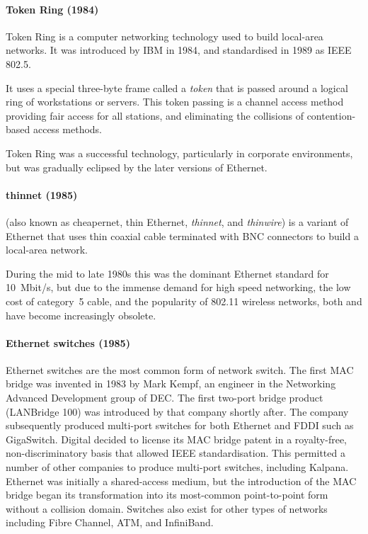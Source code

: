 \paragraph{Token Ring (1984)}%
Token Ring is a computer networking technology used to build local-area networks.
It was introduced by IBM in 1984, and standardised in 1989 as \acs{IEEE} 802.5.

It uses a special three-byte frame called a \emph{token} that is passed around a logical ring of workstations or servers.
This token passing is a channel access method providing fair access for all stations, and eliminating the collisions of contention-based access methods.

Token Ring was a successful technology, particularly in corporate environments, but was gradually eclipsed by the later versions of Ethernet.

\paragraph{thinnet (1985)}%
 (also known as cheapernet, thin Ethernet, \emph{thinnet}, and \emph{thinwire}) is a variant of Ethernet that uses thin coaxial cable terminated with \acs{BNC} connectors to build a local-area network.

During the mid to late 1980s this was the dominant Ethernet standard for 10~Mbit/s, %
but due to the immense demand for high speed networking, the low cost of category~5 cable, and the popularity of 802.11 wireless networks, both  and  have become increasingly obsolete.

\paragraph{Ethernet switches (1985)}%
Ethernet switches are the most common form of network switch.
The first \acs{MAC} bridge was invented in 1983 by Mark Kempf, an engineer in the Networking Advanced Development group of \gls{DEC}.
The first two-port bridge product (LANBridge 100) was introduced by that company shortly after.
The company subsequently produced multi-port switches for both Ethernet and \acs{FDDI} such as GigaSwitch.
Digital decided to license its \acs{MAC} bridge patent in a royalty-free, non-dis\-crim\-i\-na\-tory basis that allowed \acs{IEEE} standardisation.
This permitted a number of other companies to produce multi-port switches, including Kalpana.
Ethernet was initially a shared-access medium, but the introduction of the \acs{MAC} bridge began its transformation into its most-common point-to-point form without a collision domain.
Switches also exist for other types of networks including Fibre Channel, \gls{ATM}, and InfiniBand.
    
